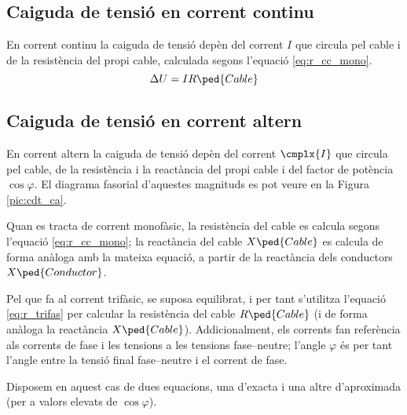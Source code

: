 \subsection{Caiguda de tensi\'{o} en corrent continu}

En corrent continu la caiguda de tensi\'{o} dep\`{e}n del corrent $I$ que circula pel cable i de la  resist\`{e}ncia del propi cable, calculada segons l'equaci\'{o} \eqref{eq:r_cc_mono}.
\begin{equation}
   \Delta U = I R\ped{Cable}
\end{equation}

\subsection{Caiguda de tensi\'{o} en corrent altern}

En corrent altern la caiguda de tensi\'{o}
dep\`{e}n del  corrent $\cmplx{I}$ que circula pel cable, de la
resist\`{e}ncia i la react\`{a}ncia del propi cable i del factor de
pot\`{e}ncia $\cos \varphi$. El diagrama fasorial d'aquestes magnituds
es pot veure en la Figura \vref{pic:cdt_ca}.

\begin{center}
   
   \label{pic:cdt_ca}
\end{center}

Quan es tracta de corrent monof\`{a}sic, la resist\`{e}ncia del cable es calcula segons l'equaci\'{o}
\eqref{eq:r_cc_mono}; la react\`{a}ncia del cable $X\ped{Cable}$ es calcula de forma an\`{a}loga
amb la mateixa equaci\'{o}, a partir de la react\`{a}ncia dels conductors $X\ped{Conductor}$.

Pel que fa al corrent trif\`{a}sic, se suposa equilibrat, i per tant s'utilitza l'equaci\'{o}
\eqref{eq:r_trifas} per calcular la resist\`{e}ncia del cable $R\ped{Cable}$ (i de forma
an\`{a}loga la react\`{a}ncia $X\ped{Cable}$). Addicionalment, els corrents fan refer\`{e}ncia als
corrents de fase i les tensions a les tensions fase--neutre; l'angle $\varphi$ \'{e}s per
tant l'angle entre la tensi\'{o} final fase--neutre i el corrent de fase.

Disposem en aquest cas de dues equacions, una d'exacta i una altre d'aproximada (per a valors elevats de $\cos \varphi$).

